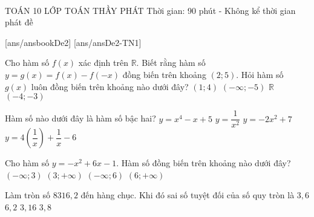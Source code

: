 ﻿﻿\begin{name}
	{\tenchude}
	{TOÁN 10}
	{LỚP TOÁN THẦY PHÁT}
	{Thời gian: 90 phút - Không kể thời gian phát đề}
\end{name}
[ans/ansbookDe2]
\TN
{}[ans/ansDe2-TN1]
\begin{ex}%
	Cho hàm số $ f(x) $ xác định trên $ \mathbb{R} $. Biết rằng hàm số $ y = g(x) = f(x) - f(-x) $ đồng biến trên khoảng $(2;5)$. Hỏi hàm số $ g(x) $ luôn đồng biến trên khoảng nào dưới đây?
	\choice
	{$(1;4)$}
	{$(-\infty;-5)$}
	{$\mathbb{R}$}
	{\True $(-4;-3)$}
\end{ex}

\begin{ex}%
	Hàm số nào dưới đây là hàm số bậc hai?
	\choice
	{$y=x^4-x+5$}
	{$y=\dfrac{1}{x^2}$}
	{\True $y=-2x^2+7$}
	{$y=4\left(\dfrac{1}{x}\right)+\dfrac{1}{x}-6$}
\end{ex}

\begin{ex}%
	Cho hàm số $y=-x^2+6x-1$. Hàm số đồng biến trên khoảng nào dưới đây?
	\choice
	{\True $(-\infty;3)$}
	{$(3;+\infty)$}
	{$(-\infty;6)$}
	{$(6;+\infty)$}
\end{ex}

\begin{ex}%
	Làm tròn số $8316{,}2$ đến hàng chục. Khi đó sai số tuyệt đối của số quy tròn là
	\choice
	{$3{,}6$}
	{$6{,}2$}
	{$3{,}16$}
	{\True $3{,}8$}
\end{ex}

